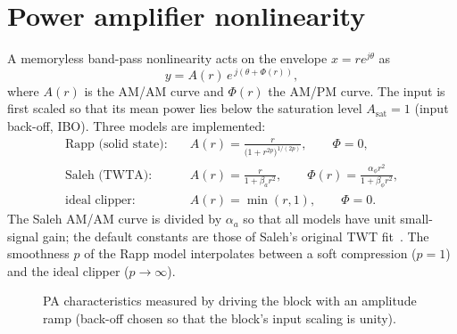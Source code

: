 \section{Power amplifier nonlinearity}
A memoryless band-pass nonlinearity acts on the envelope $x=re^{j\theta}$ as
\begin{equation}
  y=A(r)\,e^{\,j(\theta+\Phi(r))},
\end{equation}
where $A(r)$ is the AM/AM curve and $\Phi(r)$ the AM/PM curve. The input is first scaled so that
its mean power lies  below the saturation level $A_{\mathrm{sat}}=1$
(input back-off, IBO). Three models are implemented:
\begin{align}
  \text{Rapp (solid state):}\quad & A(r)=\frac{r}{\big(1+r^{2p}\big)^{1/(2p)}},\qquad\Phi=0,\\
  \text{Saleh (TWTA):}\quad & A(r)=\frac{r}{1+\beta_a r^2},\qquad \Phi(r)=\frac{\alpha_\phi r^2}{1+\beta_\phi r^2},\\
  \text{ideal clipper:}\quad & A(r)=\min(r,1),\qquad\Phi=0.
\end{align}
The Saleh AM/AM curve is divided by $\alpha_a$ so that all models have unit small-signal gain;
the default constants are those of Saleh's original TWT fit~\cite{saleh1981}. The smoothness
$p$ of the Rapp model interpolates between a soft compression ($p=1$) and the ideal clipper
($p\to\infty$).

\begin{figure}[htbp]
\centering
{}
\caption{PA characteristics measured by driving the  block with an amplitude
ramp (back-off chosen so that the block's input scaling is unity).}
\label{fig:pa}
\end{figure}

